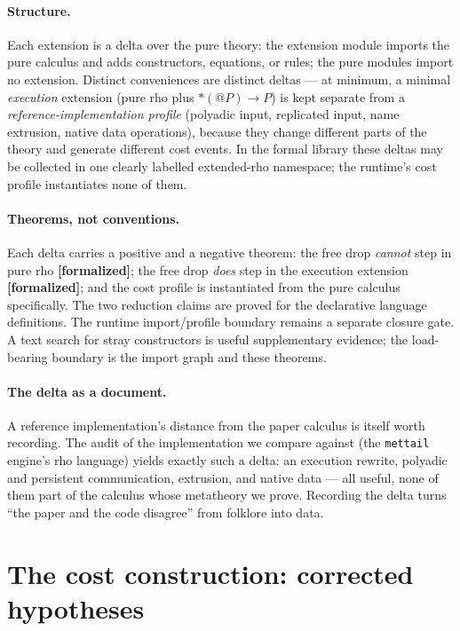 \documentclass[11pt]{article}
\newcommand{\code}[1]{\texttt{#1}}
\newcommand{\formalized}{\textbf{[formalized]}}
\begin{document}
\paragraph{Structure.} Each extension is a delta over the pure theory:
the extension module imports the pure calculus and adds constructors,
equations, or rules; the pure modules import no extension. Distinct
conveniences are distinct deltas --- at minimum, a minimal
\emph{execution} extension (pure rho plus ${*}(@P) \to P$) is kept
separate from a \emph{reference-implementation profile} (polyadic input,
replicated input, name extrusion, native data operations), because they
change different parts of the theory and generate different cost events.
In the formal library these deltas may be collected in one clearly
labelled extended-rho namespace; the runtime's cost profile instantiates
none of them.

\paragraph{Theorems, not conventions.} Each delta carries a positive and
a negative theorem: the free drop \emph{cannot} step in pure rho
\formalized{}; the free drop \emph{does} step in the execution extension
\formalized{}; and the cost profile is instantiated from the pure calculus
specifically. The two reduction claims are proved for the declarative language
definitions.  The runtime import/profile boundary remains a separate closure
gate. A text search for stray constructors is useful supplementary evidence;
the load-bearing boundary is the import graph and these theorems.

\paragraph{The delta as a document.} A reference implementation's
distance from the paper calculus is itself worth recording. The audit of
the implementation we compare against (the \code{mettail} engine's rho
language) yields exactly such a delta: an execution rewrite, polyadic and
persistent communication, extrusion, and native data --- all useful, none
of them part of the calculus whose metatheory we prove. Recording the
delta turns ``the paper and the code disagree'' from folklore into data.

\section{The cost construction: corrected hypotheses}
\label{sec:cost}
\end{document}
